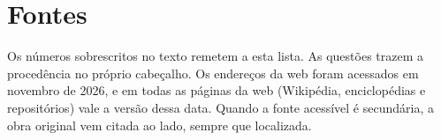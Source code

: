 \chapter*{Fontes}
\small
Os números sobrescritos no texto remetem a esta lista. As questões trazem a procedência no próprio cabeçalho. Os endereços da web foram acessados em novembro de 2026, e em todas as páginas da web (Wikipédia, enciclopédias e repositórios) vale a versão dessa data. Quando a fonte acessível é secundária, a obra original vem citada ao lado, sempre que localizada.

\begingroup
\makeatletter
\renewcommand{\chapter}{\@ifstar{\@gobble}{\@gobble}}
\renewcommand{\@mkboth}[2]{}
\makeatother
